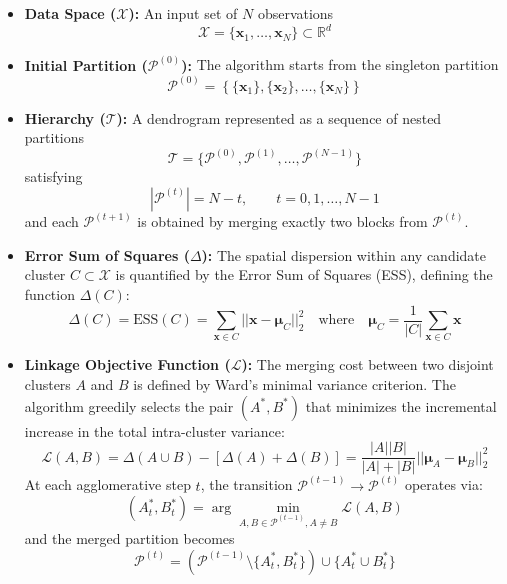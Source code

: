 \begin{itemize}
  \item \textbf{Data Space ($\mathcal{X}$):} An input set of $N$ observations
  \begin{equation}
    \mathcal{X} = \{\mathbf{x}_1, \dots, \mathbf{x}_N\} \subset \mathbb{R}^d
  \end{equation}

  \item \textbf{Initial Partition ($\mathcal{P}^{(0)}$):} The algorithm starts from the singleton partition
  \begin{equation}
    \mathcal{P}^{(0)} = \left\{ \{\mathbf{x}_1\}, \{\mathbf{x}_2\}, \dots, \{\mathbf{x}_N\} \right\}
  \end{equation}

  \item \textbf{Hierarchy ($\mathcal{T}$):} A dendrogram represented as a sequence of nested partitions
  \begin{equation}
    \mathcal{T} = \{\mathcal{P}^{(0)}, \mathcal{P}^{(1)}, \dots, \mathcal{P}^{(N-1)}\}
  \end{equation}
  satisfying
  \begin{equation}
    |\mathcal{P}^{(t)}| = N - t, \qquad t = 0,1,\dots,N-1
  \end{equation}
  and each $\mathcal{P}^{(t+1)}$ is obtained by merging exactly two blocks from $\mathcal{P}^{(t)}$.

  \item \textbf{Error Sum of Squares ($\Delta$):} The spatial dispersion within any candidate cluster $C \subset \mathcal{X}$ is quantified by the Error Sum of Squares (ESS), defining the function $\Delta(C)$:
  \begin{equation}
    \Delta(C) = \text{ESS}(C) = \sum_{\mathbf{x} \in C} ||\mathbf{x} - \boldsymbol{\mu}_C||_2^2 \quad \text{where} \quad \boldsymbol{\mu}_C = \frac{1}{|C|}\sum_{\mathbf{x} \in C} \mathbf{x}
  \end{equation}
  \item \textbf{Linkage Objective Function ($\mathcal{L}$):} The merging cost between two disjoint clusters $A$ and $B$ is defined by Ward's minimal variance criterion. The algorithm greedily selects the pair $(A^*, B^*)$ that minimizes the incremental increase in the total intra-cluster variance:
  \begin{equation}
    \mathcal{L}(A, B) = \Delta(A \cup B) - \left[\Delta(A) + \Delta(B)\right] = \frac{|A||B|}{|A| + |B|} ||\boldsymbol{\mu}_A - \boldsymbol{\mu}_B||_2^2
  \end{equation}
  At each agglomerative step $t$, the transition $\mathcal{P}^{(t-1)} \rightarrow \mathcal{P}^{(t)}$ operates via:
  \begin{equation}
      (A_t^*, B_t^*) = \arg\min_{A, B \in \mathcal{P}^{(t-1)}, A \neq B} \mathcal{L}(A, B)
  \end{equation}
  and the merged partition becomes
  \begin{equation}
    \mathcal{P}^{(t)} =
    \left(\mathcal{P}^{(t-1)} \setminus \{A_t^*, B_t^*\}\right) \cup \{A_t^* \cup B_t^*\}
  \end{equation}


\end{itemize}
